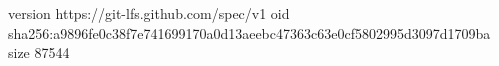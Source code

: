 version https://git-lfs.github.com/spec/v1
oid sha256:a9896fe0c38f7e741699170a0d13aeebc47363c63e0cf5802995d3097d1709ba
size 87544
